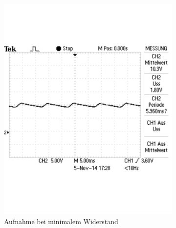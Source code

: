 \documentclass[12pt,a4paper]{article}
\begin{document}
\begin{figure}[H]
        \centering
        \begin{subfigure}[b]{0.48\textwidth}
                \includegraphics[width=\textwidth , scale = 0.4]{2_6_100F_1.pdf}
                \caption[Aufnahme bei minimalem Widerstand]{Aufnahme bei minimalem Widerstand}
 				 \label{fig:2_6_100F_1}
        \end{subfigure}%
        \hfill
        \begin{subfigure}[b]{0.48\textwidth}

\end{subfigure}
\end{figure}
\end{document}

